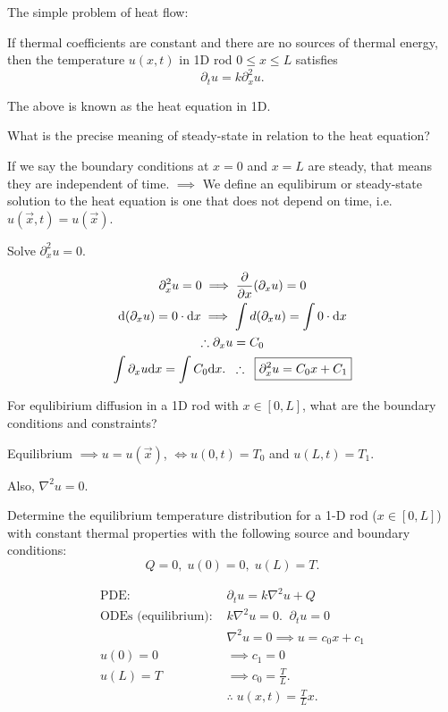 The simple problem of heat flow: 

\begin{quest}
	\item \cloze If thermal coefficients are constant and there are no sources of thermal energy, then the temperature $u(x, t)$ in 1D rod $0\leq x \leq L$ satisfies \[ \partial_t u = k \partial_x^2 u .\]

	\item \cloze The above is known as the heat equation in 1D.

	\item What is the precise meaning of steady-state in relation to the heat equation?
	\begin{ans}
		If we say the boundary conditions at $x=0$ and $x=L$ are steady, that means they are independent of time. $\implies$ We define an equlibirum or steady-state solution to the heat equation is one that does not depend on time, i.e. $u(\vec{x}, t) = u(\vec{x})$.  
	\end{ans}

	\item Solve $\partial_x^2 u = 0$.
	\begin{ans}
		\begin{gather*}
			\partial_x^2 u = 0 
				\implies  \frac{\partial}{\partial x} (\partial_x u) = 0  \\
			\text{d}(\partial_x u) = 0\cdot \text{d} x \implies
				\int d (\partial_x u) = \int 0 \cdot \text{d} x \\
			\therefore \partial_x u = C_0 \\ 
			\int \partial_x u \text{d} x = \int C_0 \text{d} x. \;\;
				\therefore\;\; \boxed{ \partial_x^2 u = C_0 x + C_1 } 
		\end{gather*}
	\end{ans}

	\item For equlibirium diffusion in a 1D rod with $x\in [0, L]$, what are the boundary conditions and  constraints?
	\begin{ans}
		Equilibrium $\implies u = u(\vec{x})$, $\iff u(0,t) = T_0 $ and $u(L, t) = T_1$. 
		
		Also, $\nabla^2 u = 0$.
	\end{ans}

	\item Determine the equilibrium temperature distribution for a 1-D rod ($x\in[0, L]$) with constant thermal properties with the following source and boundary conditions: 
	\[ Q = 0, \; u(0) = 0, \; u(L) = T .\]
	\begin{ans}
		\begin{align*}
			\text{PDE: }
				&\partial_t u = k\nabla^2 u + Q \tag{heat eq}\\
			\text{ODEs (equilibrium): }
				& k\nabla^2 u = 0.\;\; \partial_t u = 0 \\
				& \nabla^2 u = 0 \implies u = c_0 x + c_1 \\
			u(0) = 0 & 
				\implies c_1 = 0 \\
			u(L) = T &
				\implies c_0 = \frac{T}{L}. \\
			& \therefore \; \boxed{ u(x, t) = \frac{T}{L}x }.  
		\end{align*}
	\end{ans}


\end{quest}
